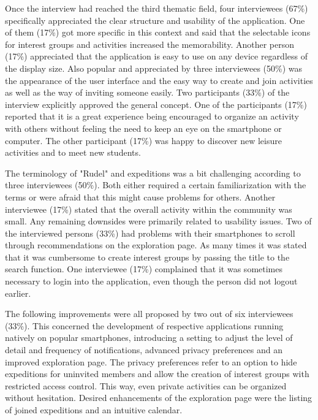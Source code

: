 \documentclass[12pt,numbers=noenddot,parskip,bibliography=totocnumbered,listof=totocnumbered,draft]{scrreprt}
\begin{document}
Once the interview had reached the third thematic field, four interviewees (67\%) specifically appreciated the clear structure and usability of the application. One of them (17\%) got more specific in this context and said that the selectable icons for interest groups and activities increased the memorability. Another person (17\%) appreciated that the application is easy to use on any device regardless of the display size. Also popular and appreciated by three interviewees (50\%) was the appearance of the user interface and the easy way to create and join activities as well as the way of inviting someone easily. Two participants (33\%) of the interview explicitly approved the general concept. One of the participants (17\%) reported that it is a great experience being encouraged to organize an activity with others without feeling the need to keep an eye on the smartphone or computer. The other participant (17\%) was happy to discover new leisure activities and to meet new students.

The terminology of "Rudel" and expeditions was a bit challenging according to three interviewees (50\%). Both either required a certain familiarization with the terms or were afraid that this might cause problems for others. Another interviewee (17\%) stated that the overall activity within the community was small. Any remaining downsides were primarily related to usability issues. Two of the interviewed persons (33\%) had problems with their smartphones to scroll through recommendations on the exploration page. As many times it was stated that it was cumbersome to create interest groups by passing the title to the search function. One interviewee (17\%) complained that it was sometimes necessary to login into the application, even though the person did not logout earlier.

The following improvements were all proposed by two out of six interviewees (33\%). This concerned the development of respective applications running natively on popular smartphones, introducing a setting to adjust the level of detail and frequency of notifications, advanced privacy preferences and an improved exploration page. The privacy preferences refer to an option to hide expeditions for uninvited members and allow the creation of interest groups with restricted access control. This way, even private activities can be organized without hesitation. Desired enhancements of the exploration page were the listing of joined expeditions and an intuitive calendar.
\end{document}
